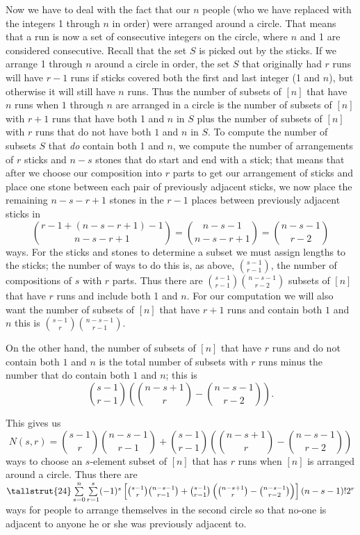 \begin{enumerate}
{Now we have to deal with the fact that our $n$ people (who we have replaced
with the integers 1 through $n$ in order) were arranged around a circle. That
means that a run is now a set of consecutive integers on the circle, where $n$
and 1 are considered consecutive.  Recall that the set $S$ is picked out by the
sticks. If we arrange 1 through
$n$ around a circle in order, the set
$S$ that originally had
$r$ runs will have $r-1$ runs if sticks covered both the first and last integer
(1 and $n$), but otherwise it will still have $n$ runs.  Thus the number of
subsets of $[n]$ that have $n$ runs when $1$ through $n$ are  arranged in a
circle is the number of subsets of $[n]$ with $r+1$ runs that have both 1 and
$n$ in $S$ plus the number of subsets of $[n]$ with $r$ runs that do not have
both $1$ and
$n$ in $S$. To compute the number of subsets $S$ that {\em do} contain both 1
and $n$, we compute the number of arrangements of  $r$ sticks and $n-s$ stones
that do start and end with a stick; that means that after we choose our
composition into $r$ parts to get our arrangement of sticks and place one stone
between each pair of previously adjacent sticks, we now place the remaining
$n-s-r+1$ stones in the $r-1$ places between previously adjacent sticks in
$${r-1 + (n-s-r+1)-1\choose n-s-r+1}={n-s-1\choose n-s-r+1}={n-s-1\choose r-2}$$
ways. For the sticks and stones to determine a subset we must assign lengths to
the sticks; the number of ways to do this is, as above, $s-1\choose r-1$, the
number of compositions of $s$ with $r$ parts. Thus there are
${s-1\choose r-1}{n-s-1\choose r-2}$ subsets of
$[n]$ that have
$r$ runs and include both 1 and $n$.  For our computation we will also want the
number of subsets of $[n]$ that have $r+1$ runs and contain both $1$ and $n$
this is
${s-1\choose r}{n-s-1\choose r-1}$.

On the other hand, the number of subsets of $[n]$ that have $r$ runs and do not
contain both $1$ and $n$ is the total number of subsets with $r$ runs minus the
number that do contain both $1$ and $n$; this is $${s-1\choose
r-1}\left({n-s+1\choose r}- {n-s-1\choose
r-2}\right).$$ 


This gives us $$N(s,r) ={s-1\choose r}{n-s-1\choose r-1}+{s-1\choose
r-1}\left({n-s+1\choose r}- {n-s-1\choose
r-2}\right)$$ 
ways to choose an $s$-element subset of $[n]$ that has $r$ runs when $[n]$ is
arranged around a circle.  Thus there are\\
$\tallstrut{24}\sum\limits_{s=0}^n\sum\limits_{r=1}^{s}(-1)^s\left[{s-1\choose
r}{n-s-1\choose r-1}+{s-1\choose r-1}\left({n-s+1\choose r}- {n-s-1\choose
r-2}\right)\right](n-s-1)!2^r$
\\ ways for people to arrange themselves in the
second circle so that no-one is adjacent to anyone he or she was previously
adjacent to.
}


\end{enumerate}
